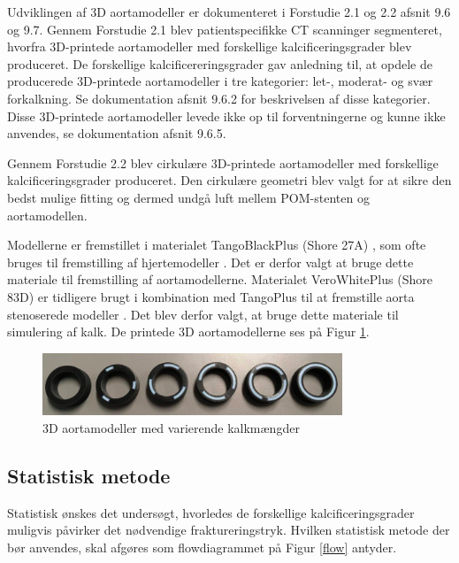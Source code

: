 Udviklingen af 3D aortamodeller er dokumenteret i Forstudie 2.1 og 2.2 afsnit 9.6 og 9.7. 
Gennem Forstudie 2.1 blev patientspecifikke CT scanninger segmenteret, hvorfra 3D-printede aortamodeller med forskellige kalcificeringsgrader blev produceret. De forskellige kalcificereringsgrader gav anledning til, at opdele de producerede 3D-printede aortamodeller i tre kategorier: let-, moderat- og svær forkalkning. Se dokumentation afsnit 9.6.2 for beskrivelsen af disse kategorier. Disse 3D-printede aortamodeller levede ikke op til forventningerne og kunne ikke anvendes, se dokumentation afsnit 9.6.5.   

Gennem Forstudie 2.2 blev cirkulære 3D-printede aortamodeller med forskellige kalcificeringsgrader produceret. Den cirkulære geometri blev valgt for at sikre den bedst mulige fitting og dermed undgå luft mellem POM-stenten og aortamodellen. 

Modellerne er fremstillet i materialet TangoBlackPlus (Shore 27A) \cite{Datablad_Damvig}, som ofte bruges til fremstilling af hjertemodeller \cite{tangoplus}. Det er derfor valgt at bruge dette materiale til fremstilling af aortamodellerne. Materialet VeroWhitePlus (Shore 83D) \cite{Datablad_Damvig} er tidligere brugt i kombination med TangoPlus til at fremstille aorta stenoserede modeller \cite{rapport}. Det blev derfor valgt, at bruge dette materiale til simulering af kalk. De printede 3D aortamodellerne ses på Figur \ref{alle_systematisk}.   
 
 \begin{figure}[H]
	\centering
	\includegraphics[width=0.8\textwidth]{Figure/alle_systematisk}
	\caption{3D aortamodeller med varierende kalkmængder}
	\label{alle_systematisk}
\end{figure} 
 
\subsection*{Statistisk metode}
Statistisk ønskes det undersøgt, hvorledes de forskellige kalcificeringsgrader muligvis påvirker det nødvendige fraktureringstryk. Hvilken statistisk metode der bør anvendes, skal afgøres som flowdiagrammet på Figur \ref{flow} antyder. 


